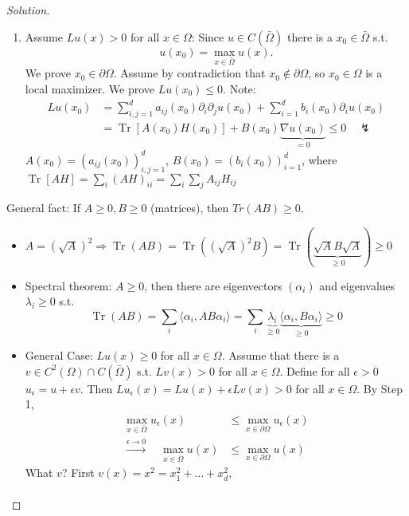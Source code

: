 \documentclass{report}
\theoremstyle{tommy}
\newcommand{\Tr}{\operatorname{Tr}}
\begin{document}
  \begin{proof}[Solution]\
    \begin{enumerate}[label=Step \arabic*:]
      \item Assume \(Lu(x) > 0\) for all \(x \in \Omega\):
      Since \(u \in C(\bar \Omega)\) there is a \(x_0 \in \bar \Omega\) s.t. 
      \[u(x_0) = \max_{x \in \bar \Omega} u(x).\]
      We prove \(x_0 \in \partial \Omega.\) Assume by contradiction that \(x_0 \notin \partial \Omega\), so \(x_0 \in \Omega\) is a local maximizer. We prove \(Lu(x_0) \le 0\). Note:
      \begin{align*}
        Lu(x_0) &= \sum_{i,j=1}^d a_{ij}(x_0) \partial_i \partial_ju(x_0) + \sum_{i=1}^d b_i(x_0) \partial_i u(x_0) \\
        &= \operatorname{Tr}[A(x_0) H(x_0)] + B(x_0) \underbrace{\nabla u(x_0)}_{=0} \le 0 \quad \lightning
      \end{align*}
      \(A(x_0) = (a_{ij}(x_0))_{i,j=1}^d\), \(B(x_0) = (b_i(x_0))_{i=1}^d\),
      where \(\Tr[AH] = \sum_i(AH)_{ii} = \sum_i \sum_j A_{ij} H_{ij}\)
    \end{enumerate}
    General fact: If \(A \ge 0, B \ge 0\) (matrices), then \(Tr(AB) \ge 0\).
    \begin{itemize}
      \item \(A = (\sqrt{A})^2 \Rightarrow \Tr(AB) = \Tr((\sqrt{A})^2B) = \Tr(\underbrace{\sqrt{A}B\sqrt{A}}_{\ge 0}) \ge 0\)
      \item Spectral theorem: \(A \ge 0\), then there are eigenvectors \((\alpha_i)\) and eigenvalues \(\lambda_i \ge 0\) s.t. 
      \[\Tr(AB) = \sum_i \langle \alpha_i, AB\alpha_i\rangle = \sum_i \underbrace{\lambda_i}_{\ge 0} \underbrace{\langle \alpha_i, B \alpha_i\rangle}_{\ge 0} \ge 0\]
    \item General Case: \(L u(x) \ge 0\) for all \(x \in \Omega\). Assume that there is a \(v \in C^2(\Omega) \cap C(\bar \Omega)\) s.t. \(Lv(x) > 0\) for all \(x \in \Omega\). Define for all \(\epsilon > 0\) \(u_\epsilon = u + \epsilon v\). Then \(L u_\epsilon(x) = Lu(x) + \epsilon Lv(x) > 0\) for all \(x \in \Omega\). By Step 1,
    \begin{align*}
      \max_{x \in \bar \Omega} u_\epsilon(x) &\le \max_{x \in \partial \Omega} u_\epsilon(x) \\
      \xrightarrow{\epsilon \to 0} \quad \max_{x \in \bar \Omega} u(x) &\le \max_{x \in \partial \Omega} u(x)
    \end{align*}
    What \(v\)? First \(v(x) = x^2 = x_1^2 + \dots + x_d^2\),
    \begin{align*}

\end{align*}
\end{itemize}
\end{proof}
\end{document}
